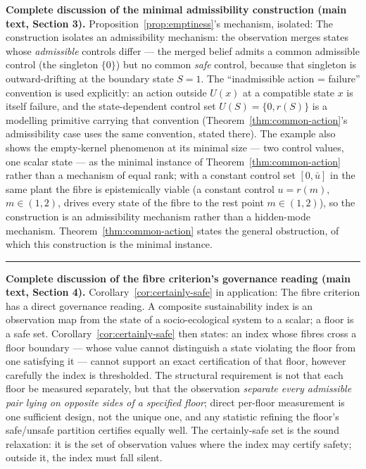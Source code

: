 \documentclass[11pt]{article}
\theoremstyle{definition}
\begin{document}
\bigskip
\noindent\textbf{Complete discussion of the minimal admissibility construction (main text, Section 3).}
Proposition~\ref{prop:emptiness}'s mechanism, isolated:
The construction isolates an admissibility mechanism: the observation merges states whose \emph{admissible}
controls differ --- the merged belief admits a common admissible control
(the singleton \(\{0\}\)) but no common \emph{safe} control, because
that singleton is outward-drifting at the boundary state \(S = 1\). The
``inadmissible action = failure'' convention is used explicitly: an action outside \(U(x)\) at a compatible state \(x\) is
itself failure, and the state-dependent control set
\(U(S) = \{0, r(S)\}\) is a modelling primitive carrying that convention
(Theorem~\ref{thm:common-action}'s admissibility case uses the same convention, stated there).
The example also shows the empty-kernel phenomenon at its minimal size
--- two control values, one scalar state --- as the minimal instance of
Theorem~\ref{thm:common-action} rather than a mechanism of equal rank; with a constant control
set \([0, \bar u]\) in the same plant the fibre is epistemically viable
(a constant control \(u = r(m)\), \(m \in (1,2)\), drives every state of
the fibre to the rest point \(m \in (1,2)\)), so the construction is an admissibility mechanism rather than a hidden-mode mechanism. Theorem~\ref{thm:common-action} states the general obstruction, of which this construction is
the minimal instance.
\rule{0.5\linewidth}{0.5pt}

\bigskip
\noindent\textbf{Complete discussion of the fibre criterion's governance reading (main text, Section 4).}
Corollary~\ref{cor:certainly-safe} in application:
The fibre criterion has a direct governance reading. A composite
sustainability index is an observation map from the state of a
socio-ecological system to a scalar; a floor is a safe set. Corollary~\ref{cor:certainly-safe}
then states: an index whose fibres cross a floor boundary --- whose
value cannot distinguish a state violating the floor from one satisfying
it --- cannot support an exact certification of that floor, however
carefully the index is thresholded. The structural requirement is not
that each floor be measured separately, but that the observation
\emph{separate every admissible pair lying on opposite sides of a specified floor}; direct per-floor measurement is one sufficient design,
not the unique one, and any statistic refining the floor's safe/unsafe
partition certifies equally well. The certainly-safe set is the sound relaxation: it is the set of observation values where the index may certify safety; outside
it, the index must fall silent.
\end{document}

